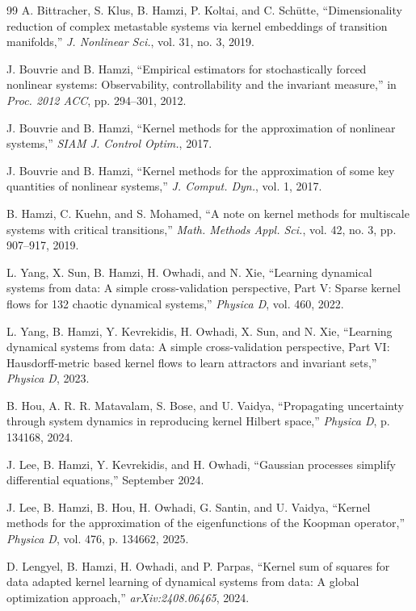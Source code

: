 \documentclass[11pt,a4paper]{article}
\begin{document}
\begin{thebibliography}{99}
A. Bittracher, S. Klus, B. Hamzi, P. Koltai, and C. Sch\"{u}tte, ``Dimensionality reduction of complex metastable systems via kernel embeddings of transition manifolds,'' \textit{J. Nonlinear Sci.}, vol. 31, no. 3, 2019.

J. Bouvrie and B. Hamzi, ``Empirical estimators for stochastically forced nonlinear systems: Observability, controllability and the invariant measure,'' in \textit{Proc. 2012 ACC}, pp. 294--301, 2012.

J. Bouvrie and B. Hamzi, ``Kernel methods for the approximation of nonlinear systems,'' \textit{SIAM J. Control Optim.}, 2017.

J. Bouvrie and B. Hamzi, ``Kernel methods for the approximation of some key quantities of nonlinear systems,'' \textit{J. Comput. Dyn.}, vol. 1, 2017.

B. Hamzi, C. Kuehn, and S. Mohamed, ``A note on kernel methods for multiscale systems with critical transitions,'' \textit{Math. Methods Appl. Sci.}, vol. 42, no. 3, pp. 907--917, 2019.

L. Yang, X. Sun, B. Hamzi, H. Owhadi, and N. Xie, ``Learning dynamical systems from data: A simple cross-validation perspective, Part V: Sparse kernel flows for 132 chaotic dynamical systems,'' \textit{Physica D}, vol. 460, 2022.

L. Yang, B. Hamzi, Y. Kevrekidis, H. Owhadi, X. Sun, and N. Xie, ``Learning dynamical systems from data: A simple cross-validation perspective, Part VI: Hausdorff-metric based kernel flows to learn attractors and invariant sets,'' \textit{Physica D}, 2023.

B. Hou, A. R. R. Matavalam, S. Bose, and U. Vaidya, ``Propagating uncertainty through system dynamics in reproducing kernel Hilbert space,'' \textit{Physica D}, p. 134168, 2024.

J. Lee, B. Hamzi, Y. Kevrekidis, and H. Owhadi, ``Gaussian processes simplify differential equations,'' September 2024.

J. Lee, B. Hamzi, B. Hou, H. Owhadi, G. Santin, and U. Vaidya, ``Kernel methods for the approximation of the eigenfunctions of the Koopman operator,'' \textit{Physica D}, vol. 476, p. 134662, 2025.

D. Lengyel, B. Hamzi, H. Owhadi, and P. Parpas, ``Kernel sum of squares for data adapted kernel learning of dynamical systems from data: A global optimization approach,'' \textit{arXiv:2408.06465}, 2024.


\end{thebibliography}
\end{document}
